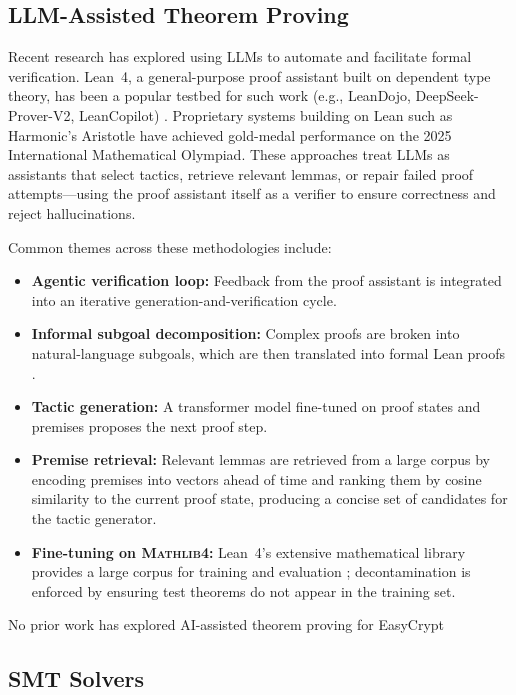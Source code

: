 \documentclass[acmsmall,natbib=false]{acmart}
\begin{document}
\subsection{LLM-Assisted Theorem Proving}
Recent research has explored using LLMs to automate and facilitate formal verification. Lean~4, a general-purpose proof assistant built on dependent type theory, has been a popular testbed for such work (e.g., LeanDojo, DeepSeek-Prover-V2, LeanCopilot) \cite{yang2023leandojo, ren2025deepseekproverv2, leancopilot}. Proprietary systems building on Lean such as Harmonic's Aristotle \cite{achim2025aristotle} have achieved gold-medal performance on the 2025 International Mathematical Olympiad. These approaches treat LLMs as assistants that select tactics, retrieve relevant lemmas, or repair failed proof attempts---using the proof assistant itself as a verifier to ensure correctness and reject hallucinations.

Common themes across these methodologies include:
\begin{itemize}
    \item \textbf{Agentic verification loop:} Feedback from the proof assistant is integrated into an iterative generation-and-verification cycle.
    \item \textbf{Informal subgoal decomposition:} Complex proofs are broken into natural-language subgoals, which are then translated into formal Lean proofs \cite{ren2025deepseekproverv2}.
    \item \textbf{Tactic generation:} A transformer model fine-tuned on proof states and premises proposes the next proof step.
    \item \textbf{Premise retrieval:} Relevant lemmas are retrieved from a large corpus by encoding premises into vectors ahead of time and ranking them by cosine similarity to the current proof state, producing a concise set of candidates for the tactic generator.
    \item \textbf{Fine-tuning on \textsc{Mathlib4}:} Lean~4's extensive mathematical library provides a large corpus for training and evaluation \cite{yang2023leandojo}; decontamination is enforced by ensuring test theorems do not appear in the training set.
\end{itemize}

No prior work has explored AI-assisted theorem proving for EasyCrypt

\subsection{SMT Solvers}
\end{document}
